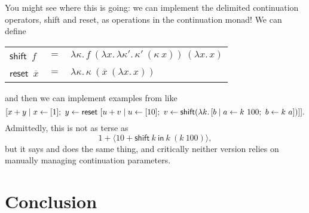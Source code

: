 \documentclass[acmsmall, nonacm, screen]{acmart}
\newcommand{\shift}[2]{\textsf{shift}~#1~\textsf{in}~#2}
\newcommand{\reset}[1]{\langle #1 \rangle}
\newcommand{\lambdaE}[2]{\lambda #1.\, #2}
\begin{document}
You might see where this is going: we can implement the delimited continuation operators, shift and
reset, as operations in the continuation monad! We can define
\begin{center}
  \begin{tabular}{lll}
    $\textsf{shift}$~$f$ & $=$ & $\lambdaE{\kappa}{f~(\lambdaE{x}{\lambdaE{\kappa'}{\kappa'~(\kappa~x)}})~(\lambdaE{x}{x})}$ \\
    $\textsf{reset}$~$\overline{x}$ & $=$ & $\lambdaE{\kappa}{\kappa~(\overline{x}~(\lambdaE{x}{x}))}$
  \end{tabular}
\end{center}
and then we can implement examples from \citeauthor{danvy1989functional} like
\[
  [x + y \mid x \leftarrow [1];\ y \leftarrow \textsf{reset}~[u + v \mid u \leftarrow [10];\ v \leftarrow \textsf{shift}(\lambdaE{k}{[b \mid a \leftarrow k~100;\ b \leftarrow k~a]})]]. \\
\]
Admittedly, this is not as terse as
\[ 1 + \reset{10 + \shift{k}{k~(k~100)}}, \]
but it says and does the same thing, and critically neither version relies on manually managing
continuation parameters.

\section{Conclusion} \label{sec:conclusion}

\begin{acks}
\end{acks}



\end{document}
